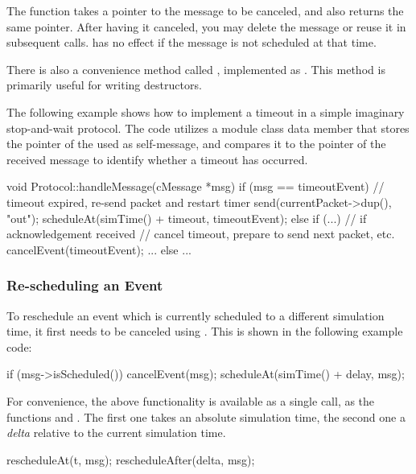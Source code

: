 \begin{ned}
The  function takes a pointer to the message to
be canceled, and also returns the same pointer. After having it
canceled, you may delete the message or reuse it in subsequent
 calls.  has no effect if
the message is not scheduled at that time.

There is also a convenience method called ,
implemented as .
This method is primarily useful for writing destructors.

The following example shows how to implement a timeout in a simple
imaginary stop-and-wait protocol. The code utilizes a 
module class data member that stores the pointer of the  used
as self-message, and compares it to the pointer of the received message
to identify whether a timeout has occurred.

\begin{cpp}
void Protocol::handleMessage(cMessage *msg)
{
    if (msg == timeoutEvent) {
        // timeout expired, re-send packet and restart timer
        send(currentPacket->dup(), "out");
        scheduleAt(simTime() + timeout, timeoutEvent);
    }
    else if (...) {  // if acknowledgement received
        // cancel timeout, prepare to send next packet, etc.
        cancelEvent(timeoutEvent);
        ...
    }
    else {
       ...
    }
}
\end{cpp}


\subsubsection{Re-scheduling an Event}
\label{sec:simple-modules:rescheduling}

To reschedule an event which is currently scheduled to a different
simulation time, it first needs to be canceled using .
This is shown in the following example code:

\begin{cpp}
if (msg->isScheduled())
    cancelEvent(msg);
scheduleAt(simTime() + delay, msg);
\end{cpp}

For convenience, the above functionality is available as a single
call, as the functions  and .
The first one takes an absolute simulation time, the second one a
\textit{delta} relative to the current simulation time.

\begin{cpp}
rescheduleAt(t, msg);
rescheduleAfter(delta, msg);
\end{cpp}


\end{ned}
